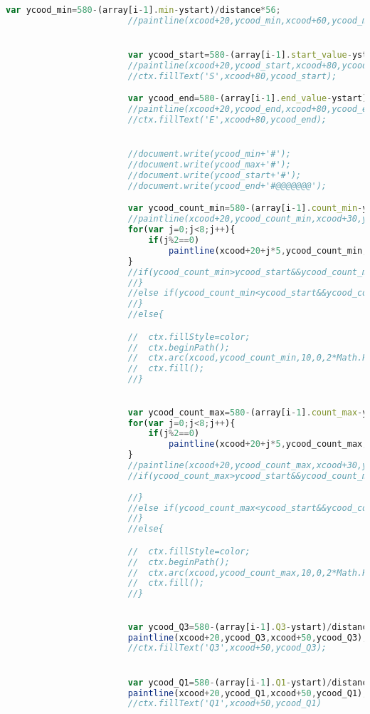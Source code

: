 \begin{lstlisting}[language = javascript]
						var ycood_min=580-(array[i-1].min-ystart)/distance*56;
						//paintline(xcood+20,ycood_min,xcood+60,ycood_min);


						var ycood_start=580-(array[i-1].start_value-ystart)/distance*56;
						//paintline(xcood+20,ycood_start,xcood+80,ycood_start);
						//ctx.fillText('S',xcood+80,ycood_start);

						var ycood_end=580-(array[i-1].end_value-ystart)/distance*56;
						//paintline(xcood+20,ycood_end,xcood+80,ycood_end);
						//ctx.fillText('E',xcood+80,ycood_end);


						//document.write(ycood_min+'#');
						//document.write(ycood_max+'#');
						//document.write(ycood_start+'#');
						//document.write(ycood_end+'#@@@@@@@');

						var ycood_count_min=580-(array[i-1].count_min-ystart)/distance*56;
						//paintline(xcood+20,ycood_count_min,xcood+30,ycood_count_min);
						for(var j=0;j<8;j++){
							if(j%2==0)
								paintline(xcood+20+j*5,ycood_count_min,xcood+25+j*5,ycood_count_min);
						}
						//if(ycood_count_min>ycood_start&&ycood_count_min<ycood_end){
						//}
						//else if(ycood_count_min<ycood_start&&ycood_count_min>ycood_end){
						//}
						//else{

						//	ctx.fillStyle=color;
						//	ctx.beginPath();
						//	ctx.arc(xcood,ycood_count_min,10,0,2*Math.PI);
						//	ctx.fill();
						//}
						

						var ycood_count_max=580-(array[i-1].count_max-ystart)/distance*56;
						for(var j=0;j<8;j++){
							if(j%2==0)
								paintline(xcood+20+j*5,ycood_count_max,xcood+25+j*5,ycood_count_max);
						}
						//paintline(xcood+20,ycood_count_max,xcood+30,ycood_count_max);
						//if(ycood_count_max>ycood_start&&ycood_count_max<ycood_end){
							
						//}
						//else if(ycood_count_max<ycood_start&&ycood_count_max>ycood_end){
						//}
						//else{

						//	ctx.fillStyle=color;
						//	ctx.beginPath();
						//	ctx.arc(xcood,ycood_count_max,10,0,2*Math.PI);
						//	ctx.fill();
						//}
						

						var ycood_Q3=580-(array[i-1].Q3-ystart)/distance*56;
						paintline(xcood+20,ycood_Q3,xcood+50,ycood_Q3);
						//ctx.fillText('Q3',xcood+50,ycood_Q3);


						var ycood_Q1=580-(array[i-1].Q1-ystart)/distance*56;
						paintline(xcood+20,ycood_Q1,xcood+50,ycood_Q1);
						//ctx.fillText('Q1',xcood+50,ycood_Q1)






\end{lstlisting}
